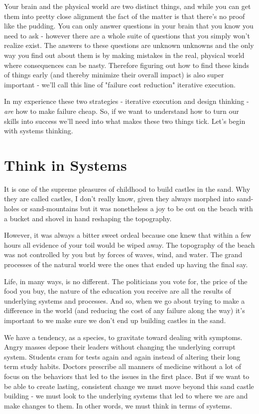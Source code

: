 \documentclass[11pt]{book}
\begin{document}
Your brain and the physical world are two distinct things, and while you can get them into pretty close alignment the fact of the matter is that there's no proof like the pudding. You can only answer questions in your brain that you know you need to ask - however there are a whole suite of questions that you simply won't realize exist. The answers to these questions are unknown unknowns and the only way you find out about them is by making mistakes in the real, physical world where consequences can be nasty. Therefore figuring out how to find these kinds of things early (and thereby minimize their overall impact) is also super important - we'll call this line of "failure cost reduction" iterative execution.
\newline

In my experience these two strategies - iterative execution and design thinking - \textit{are} how to make failure cheap. So, if we want to understand how to turn our skills into success we'll need into what makes these two things tick. Let's begin with systems thinking.

\section{Think in Systems}
It is one of the supreme pleasures of childhood to build castles in the sand. Why they are called castles, I don't really know, given they always morphed into sand-holes or sand-mountains but it was nonetheless a joy to be out on the beach with a bucket and shovel in hand reshaping the topography. 
\newline

However, it was always a bitter sweet ordeal because one knew that within a few hours all evidence of your toil would be wiped away. The topography of the beach was not controlled by you but by forces of waves, wind, and water. The grand processes of the natural world were the ones that ended up having the final say.
\newline

Life, in many ways, is no different. The politicians you vote for, the price of the food you buy, the nature of the education you receive are all the results of underlying systems and processes. And so, when we go about trying to make a difference in the world (and reducing the cost of any failure along the way) it's important to we make sure we don't end up building castles in the sand. 
\newline

We have a tendency, as a species, to gravitate toward dealing with symptoms. Angry masses depose their leaders without changing the underlying corrupt system. Students cram for tests again and again instead of altering their long term study habits. Doctors prescribe all manners of medicine without a lot of focus on the behaviors that led to the issues in the first place. But if we want to be able to create lasting, consistent change we must move beyond this sand castle building - we must look to the underlying systems that led to where we are and make changes to them. In other words, we must think in terms of systems.
\newline
\end{document}
